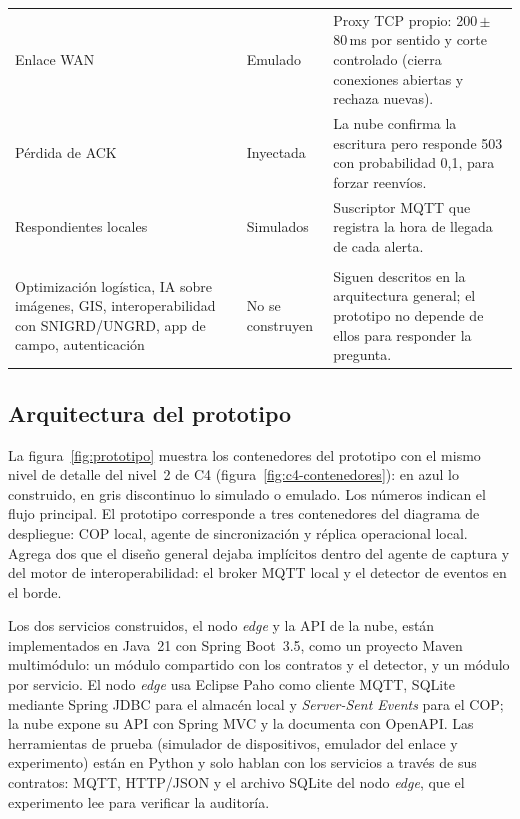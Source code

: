 \begin{table}[htbp]
\begin{tabularx}{\textwidth}{@{}p{3.6cm}p{2.4cm}L@{}}
Enlace WAN & Emulado & Proxy TCP propio: 200\,$\pm$\,80\,ms por sentido y corte controlado (cierra conexiones abiertas y rechaza nuevas). \\
Pérdida de ACK & Inyectada & La nube confirma la escritura pero responde 503 con probabilidad 0,1, para forzar reenvíos. \\
Respondientes locales & Simulados & Suscriptor MQTT que registra la hora de llegada de cada alerta. \\
\addlinespace
{} \\
Optimización logística, IA sobre imágenes, GIS, interoperabilidad con SNIGRD/UNGRD, app de campo, autenticación & No se construyen & Siguen descritos en la arquitectura general; el prototipo no depende de ellos para responder la pregunta. \\
\bottomrule
\end{tabularx}
\end{table}

\subsection{Arquitectura del prototipo}

La figura~\ref{fig:prototipo} muestra los contenedores del prototipo con el
mismo nivel de detalle del nivel~2 de C4 (figura~\ref{fig:c4-contenedores}):
en azul lo construido, en gris discontinuo lo simulado o emulado. Los números indican el flujo
principal. El prototipo corresponde a tres contenedores del diagrama de
despliegue: COP local, agente de sincronización y réplica operacional local.
Agrega dos que el diseño general dejaba implícitos dentro del agente de
captura y del motor de interoperabilidad: el broker MQTT local y el detector de
eventos en el borde.

Los dos servicios construidos, el nodo \emph{edge} y la API de la nube, están
implementados en Java~21 con Spring Boot~3.5, como un proyecto Maven
multimódulo: un módulo compartido con los contratos y el detector, y un módulo
por servicio. El nodo \emph{edge} usa Eclipse Paho como cliente MQTT, SQLite
mediante Spring JDBC para el almacén local y \emph{Server-Sent Events} para el
COP; la nube expone su API con Spring MVC y la documenta con OpenAPI. Las
herramientas de prueba (simulador de dispositivos, emulador del enlace y
experimento) están en Python y solo hablan con los servicios a través de sus
contratos: MQTT, HTTP/JSON y el archivo SQLite del nodo \emph{edge}, que el
experimento lee para verificar la auditoría.

